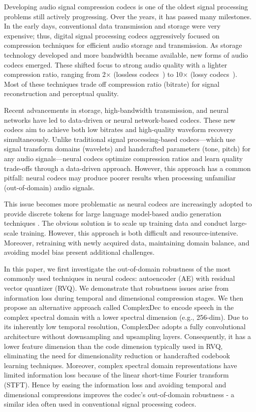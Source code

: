 Developing audio signal compression codecs is one of the oldest signal processing problems still actively progressing. Over the years, it has passed many milestones. In the early days, conventional data transmission and storage were very expensive; thus, digital signal processing codecs aggressively focused on compression techniques for efficient audio storage and transmission. As storage technology developed and more bandwidth became available, new forms of audio codecs emerged. These shifted focus to strong audio quality with a lighter compression ratio, ranging from 2× (lossless codecs~\cite{mpeg4, flac}) to 10× (lossy codecs~\cite{ opus, amrwb, evs}). Most of these techniques trade off compression ratio (bitrate) for signal reconstruction and perceptual quality.

Recent advancements in storage, high-bandwidth transmission, and neural networks have led to data-driven or neural network-based codecs. These new codecs aim to achieve both low bitrates and high-quality waveform recovery simultaneously. Unlike traditional signal processing-based codecs—which use signal transform domains (wavelets) and handcrafted parameters (tone, pitch) for any audio signals—neural codecs optimize compression ratios and learn quality trade-offs through a data-driven approach. However, this approach has a common pitfall: neural codecs may produce poorer results when processing unfamiliar (out-of-domain) audio signals.

This issue becomes more problematic as neural codecs are increasingly adopted to provide discrete tokens for large language model-based audio generation techniques \cite{gslm, audiolm, valle, musicgen}. The obvious solution is to scale up training data and conduct large-scale training. However, this approach is both difficult and resource-intensive. Moreover, retraining with newly acquired data, maintaining domain balance, and avoiding model bias present additional challenges.

In this paper, we first investigate the out-of-domain robustness of the most commonly used techniques in neural codecs: autoencoder (AE) with residual vector quantizer (RVQ). We demonstrate that robustness issues arise from information loss during temporal and dimensional compression stages. We then propose an alternative approach called ComplexDec to encode speech in the complex spectral domain with a lower spectral dimension (e.g., 256-dim). Due to its inherently low temporal resolution, ComplexDec adopts a fully convolutional architecture without downsampling and upsampling layers. Consequently, it has a lower feature dimension than the code dimension typically used in RVQ, eliminating the need for dimensionality reduction or handcrafted codebook learning techniques. Moreover, complex spectral domain representations have limited information loss because of the linear short-time Fourier transform (STFT). Hence by easing the information loss and avoiding temporal and dimensional compressions improves the codec's out-of-domain robustness - a similar idea often used in conventional signal processing codecs.

